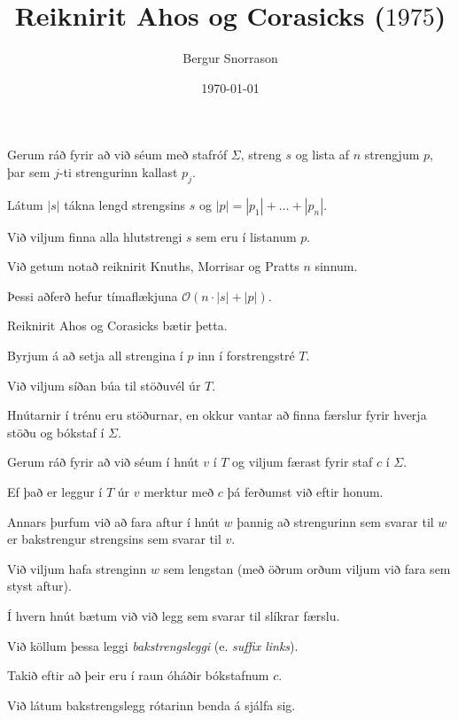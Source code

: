 \title{Reiknirit Ahos og Corasicks ($1975$)}
\author{Bergur Snorrason}
\date{\today}



\frame{\titlepage}

{
    {
        \item<1-> Gerum ráð fyrir að við séum með stafróf $\Sigma$, streng $s$ og lista af $n$ strengjum $p$, þar sem $j$-ti strengurinn kallast $p_j$.
        \item<2-> Látum $|s|$ tákna lengd strengsins $s$ og $|p| = |p_1| + \dots + |p_n|$.
        \item<3-> Við viljum finna alla hlutstrengi $s$ sem eru í listanum $p$.
        \item<4-> Við getum notað reiknirit Knuths, Morrisar og Pratts $n$ sinnum.
        \item<5-> Þessi aðferð hefur tímaflækjuna $\mathcal{O}(n \cdot |s| + |p|)$.
        \item<6-> Reiknirit Ahos og Corasicks bætir þetta.
    }
}

{
    {
        \item<1-> Byrjum á að setja all strengina í $p$ inn í forstrengstré $T$.
        \item<2-> Við viljum síðan búa til stöðuvél úr $T$.
        \item<3-> Hnútarnir í trénu eru stöðurnar, en okkur vantar að finna færslur fyrir hverja stöðu og bókstaf í $\Sigma$.
        \item<4-> Gerum ráð fyrir að við séum í hnút $v$ í $T$ og viljum færast fyrir staf $c$ í $\Sigma$.
        \item<5-> Ef það er leggur í $T$ úr $v$ merktur með $c$ þá ferðumst við eftir honum.
        \item<6-> Annars þurfum við að fara aftur í hnút $w$ þannig að strengurinn sem svarar til $w$ er bakstrengur strengsins sem svarar til $v$.
        \item<7-> Við viljum hafa strenginn $w$ sem lengstan (með öðrum orðum viljum við fara sem styst aftur).
        \item<8-> Í hvern hnút bætum við við legg sem svarar til slíkrar færslu.
        \item<9-> Við köllum þessa leggi \emph{bakstrengsleggi} (e. \emph{suffix links}).
        \item<10-> Takið eftir að þeir eru í raun óháðir bókstafnum $c$.
        \item<11-> Við látum bakstrengslegg rótarinn benda á sjálfa sig.
    }
}

